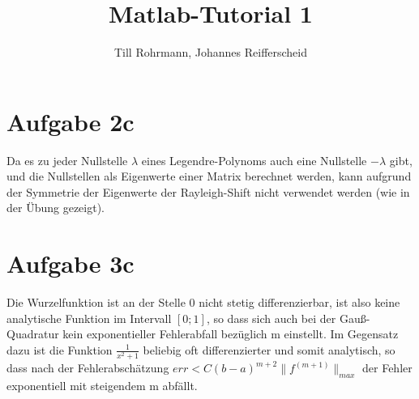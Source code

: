 \documentclass[german]{article}
\author{Till Rohrmann, Johannes Reifferscheid}
\title{
	Matlab-Tutorial 1
}
\begin{document}
  \maketitle
 
  \section{Aufgabe 2c}

Da es zu jeder Nullstelle $\lambda$ eines Legendre-Polynoms auch eine Nullstelle $-\lambda$ gibt, und die Nullstellen als Eigenwerte einer Matrix berechnet werden, kann aufgrund der Symmetrie der Eigenwerte der Rayleigh-Shift nicht verwendet werden (wie in der Übung gezeigt).

\section{Aufgabe 3c}

Die Wurzelfunktion ist an der Stelle 0 nicht stetig differenzierbar, ist also keine analytische Funktion im Intervall $[0;1]$, so dass sich auch bei der Gauß-Quadratur kein exponentieller Fehlerabfall bezüglich m einstellt. Im Gegensatz dazu ist die Funktion $\frac{1}{x^2+1}$ beliebig oft differenzierter und somit analytisch, so dass nach der Fehlerabschätzung $err < C (b-a)^{m+2} \|f^{(m+1)}\|_{max}$ der Fehler exponentiell mit steigendem m abfällt.
  
\end{document}
